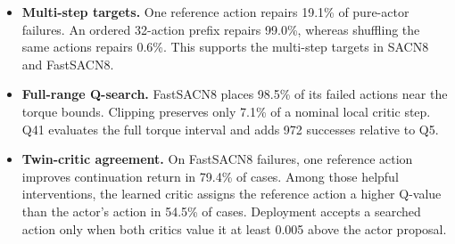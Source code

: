 \begin{itemize}
\item \textbf{Multi-step targets.} One reference action repairs 19.1\% of pure-actor failures. An ordered 32-action prefix repairs 99.0\%, whereas shuffling the same actions repairs 0.6\%. This supports the multi-step targets in SACN8 and FastSACN8.
\item \textbf{Full-range Q-search.} FastSACN8 places 98.5\% of its failed actions near the torque bounds. Clipping preserves only 7.1\% of a nominal local critic step. Q41 evaluates the full torque interval and adds 972 successes relative to Q5.
\item \textbf{Twin-critic agreement.} On FastSACN8 failures, one reference action improves continuation return in 79.4\% of cases. Among those helpful interventions, the learned critic assigns the reference action a higher Q-value than the actor's action in 54.5\% of cases. Deployment accepts a searched action only when both critics value it at least 0.005 above the actor proposal.
\end{itemize}

